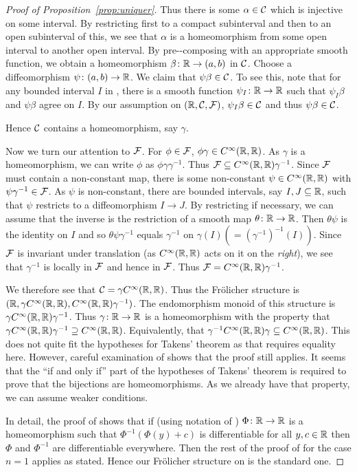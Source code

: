 \documentclass[%
12pt,%
arxiv,%
defaults
]{myclass}
\begin{document}
\begin{proof}[{Proof of Proposition~\ref{prop:uniquer}}]
Thus there is some \(\alpha \in \mathcal{C}\) which is injective on some interval.
By restricting first to a compact subinterval and then to an open subinterval of this, we see that \(\alpha\) is a homeomorphism from some open interval to another open interval.
By pre\hyp{}\hyp{}composing with an appropriate smooth function, we obtain a homeomorphism \(\beta \colon \mathbb{R} \to (a,b)\) in \(\mathcal{C}\).
Choose a diffeomorphism \(\psi \colon (a,b) \to \mathbb{R}\).
We claim that \(\psi \beta \in \mathcal{C}\).
To see this, note that for any bounded interval \(I\) in \R, there is a smooth function \(\psi_I \colon \mathbb{R} \to \mathbb{R}\) such that \(\psi_I \beta\) and \(\psi \beta\) agree on \(I\).
By our assumption on \((\mathbb{R}, \mathcal{C}, \mathcal{F})\), \(\psi_I \beta \in \mathcal{C}\) and thus \(\psi \beta \in \mathcal{C}\).

Hence \(\mathcal{C}\) contains a homeomorphism, say \(\gamma\).

Now we turn our attention to \(\mathcal{F}\).
For \(\phi \in \mathcal{F}\), \(\phi \gamma \in C^\infty(\mathbb{R},\mathbb{R})\).
As \(\gamma\) is a homeomorphism, we can write \(\phi\) as \(\phi \gamma \gamma^{-1}\).
Thus \(\mathcal{F} \subseteq C^\infty(\mathbb{R},\mathbb{R}) \gamma^{-1}\).
Since \(\mathcal{F}\) must contain a non\hyp{}constant map, there is some non\hyp{}constant \(\psi \in C^\infty(\mathbb{R},\mathbb{R})\) with \(\psi \gamma^{-1} \in \mathcal{F}\).
As \(\psi\) is non\hyp{}constant, there are bounded intervals, say \(I, J \subseteq \mathbb{R}\), such that \(\psi\) restricts to a diffeomorphism \(I \to J\).
By restricting if necessary, we can assume that the inverse is the restriction of a smooth map \(\theta \colon \mathbb{R} \to \mathbb{R}\).
Then \(\theta \psi\) is the identity on \(I\) and so \(\theta \psi \gamma^{-1}\) equals \(\gamma^{-1}\) on \(\gamma(I) (= (\gamma^{-1})^{-1}(I))\).
Since \(\mathcal{F}\) is invariant under translation (as \(C^\infty(\mathbb{R},\mathbb{R})\) acts on it on the \emph{right}), we see that \(\gamma^{-1}\) is locally in \(\mathcal{F}\) and hence in \(\mathcal{F}\).
Thus \(\mathcal{F} = C^\infty(\mathbb{R},\mathbb{R}) \gamma^{-1}\).

We therefore see that \(\mathcal{C} = \gamma C^\infty(\mathbb{R},\mathbb{R})\).
Thus the Fr\"olicher structure is \((\mathbb{R}, \gamma C^\infty(\mathbb{R},\mathbb{R}), C^\infty(\mathbb{R},\mathbb{R}) \gamma^{-1})\).
The endomorphism monoid of this structure is \(\gamma C^\infty(\mathbb{R},\mathbb{R}) \gamma^{-1}\).
Thus \(\gamma \colon \mathbb{R} \to \mathbb{R}\) is a homeomorphism with the property that \(\gamma C^\infty(\mathbb{R},\mathbb{R}) \gamma^{-1} \supseteq C^\infty(\mathbb{R},\mathbb{R})\).
Equivalently, that \(\gamma^{-1} C^\infty(\mathbb{R},\mathbb{R}) \gamma \subseteq C^\infty(\mathbb{R},\mathbb{R})\).
This does not quite fit the hypotheses for Takens' theorem as that requires equality here.
However, careful examination of \cite{ft} shows that the proof still applies.
It seems that the ``if and only if'' part of the hypotheses of Takens' theorem is required to prove that the bijections are homeomorphisms.
As we already have that property, we can assume weaker conditions.

In detail, the proof of \cite[Lemma~3.1]{ft} shows that if (using notation of \cite{ft}) \(\Phi \colon \mathbb{R} \to \mathbb{R}\) is a homeomorphism such that \(\Phi^{-1}(\Phi(y) + c)\) is differentiable for all \(y, c \in \mathbb{R}\) then \(\Phi\) and \(\Phi^{-1}\) are differentiable everywhere.
Then the rest of the proof of \cite[Theorem~2]{ft} for the case \(n = 1\) applies as stated.
Hence our Fr\"olicher structure on \R is the standard one.
\end{proof}
\end{document}
